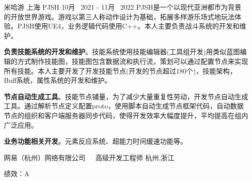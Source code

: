 


\begin{cventries}
	
\cventrycompany
{米哈游} %
{上海} %
\cventryproject
{PJSH} %
{10月~ 2021 - 11月~ 2022} %
{PJSH是一个以现代亚洲都市为背景的开放世界游戏。游戏以第三人称动作设计为基础，拓展多样游乐场式地玩法体验。PJSH使用UE4，业务逻辑代码使用C++。本人主要负责战斗系统的开发和维护。}
{ %
	\begin{cvitems}
		\item {\textbf{负责技能系统的开发和维护}。技能系统使用技能编辑器(工具组开发)用类似蓝图编辑的方式制作技能图，技能图包含数据流和执行流，策划可以通过配置节点来实现所有技能。本人主要开发了开发技能节点(开发的节点超过180个)，技能架构，Buff系统，属性系统的开发和维护。 }
		\item{\textbf{节点自动生成工具}。技能节点铺量，为了减少大量重复性劳动，开发节点自动生成工具。通过解析节点定义配置proto，使用脚本自动生成节点框架代码，自动数据节点的组织和客户端服务器同步代码，使得开发效率大幅度提升，平均提高在组内广泛应用。}
		\item{\textbf{业务功能相关开发}。元素反应系统、超能力时间缓速功能等。}
	\end{cvitems}
}


\cventrycompany
{网易（杭州）网络有限公司~~~高级开发工程师} %
{杭州,浙江} %

\cventrycompany
{绩效：A} %
{~} %


\end{cventries}
